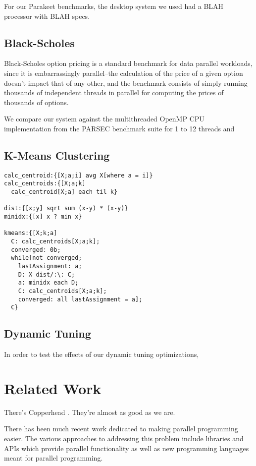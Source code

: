 \documentclass[preprint]{sigplanconf}
\begin{document}
For our Parakeet benchmarks, the desktop system we used had a BLAH processor
with BLAH specs.

\subsection{Black-Scholes}
Black-Scholes option pricing \cite{Blac73} is a standard benchmark for data
parallel workloads, since it is embarrassingly parallel--the calculation of the
price of a given option doesn't impact that of any other, and the benchmark
consists of simply running thousands of independent threads in parallel for
computing the prices of thousands of options.

We compare our system against the multithreaded OpenMP CPU implementation
from the PARSEC \cite{Bien08} benchmark suite for 1 to 12 threads and 

\subsection{K-Means Clustering}

\begin{lstlisting}[caption=K-Means Clustering implemented in Q]
calc_centroid:{[X;a;i] avg X[where a = i]}
calc_centroids:{[X;a;k] 
  calc_centroid[X;a] each til k}
  
dist:{[x;y] sqrt sum (x-y) * (x-y)}
minidx:{[x] x ? min x}

kmeans:{[X;k;a]
  C: calc_centroids[X;a;k];
  converged: 0b;
  while[not converged;
    lastAssignment: a;
    D: X dist/:\: C;
    a: minidx each D;
    C: calc_centroids[X;a;k];
    converged: all lastAssignment = a];
  C}
\end{lstlisting}
\label{QKMeans}

\subsection{Dynamic Tuning}
In order to test the effects of our dynamic tuning optimizations, 

\section{Related Work}
\label{RelatedWork}

There's Copperhead \cite{Cata10}.  They're almost as good as we are.

There has been much recent work dedicated to making parallel programming easier.
The various approaches to addressing this problem include libraries and APIs
which provide parallel functionality as well as new programming languages meant
for parallel programming.
\end{document}
